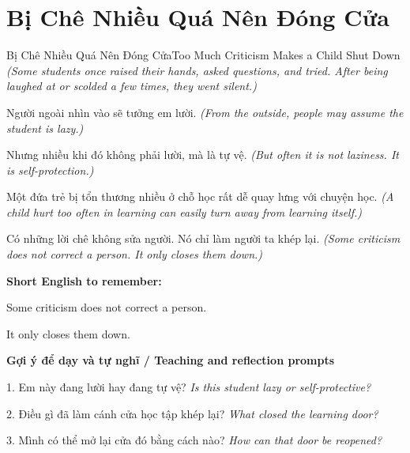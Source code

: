 \section{Bị Chê Nhiều Quá Nên Đóng Cửa}
\begin{truyen}{Bị Chê Nhiều Quá Nên Đóng Cửa}{Too Much Criticism Makes a Child Shut Down}
\textit{(Some students once raised their hands, asked questions, and tried. After being laughed at or scolded a few times, they went silent.)}

Người ngoài nhìn vào sẽ tưởng em lười.
\textit{(From the outside, people may assume the student is lazy.)}

Nhưng nhiều khi đó không phải lười, mà là tự vệ.
\textit{(But often it is not laziness. It is self-protection.)}

Một đứa trẻ bị tổn thương nhiều ở chỗ học rất dễ quay lưng với chuyện học.
\textit{(A child hurt too often in learning can easily turn away from learning itself.)}

\end{truyen}

\begin{baihoc}
Có những lời chê không sửa người. Nó chỉ làm người ta khép lại.
\textit{(Some criticism does not correct a person. It only closes them down.)}
\end{baihoc}

\begin{ghinhoanh}
\textbf{Short English to remember:}

Some criticism does not correct a person.

It only closes them down.

\end{ghinhoanh}

\begin{tuhocnhanh}
\textbf{Gợi ý để dạy và tự nghĩ / Teaching and reflection prompts}

1. Em này đang lười hay đang tự vệ? \textit{Is this student lazy or self-protective?}

2. Điều gì đã làm cánh cửa học tập khép lại? \textit{What closed the learning door?}

3. Mình có thể mở lại cửa đó bằng cách nào? \textit{How can that door be reopened?}
\end{tuhocnhanh}
\ngancach

